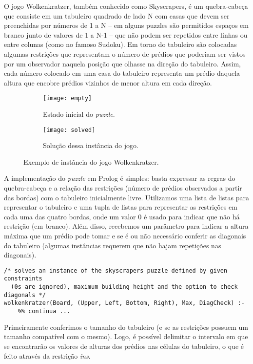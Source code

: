 O jogo Wolkenkratzer, também conhecido como Skyscrapers, é um quebra-cabeça que consiste em um tabuleiro quadrado de lado N com casas que devem ser preenchidas por números de 1 a N -- em alguns puzzles são permitidos espaços em branco junto de valores de 1 a N-1 -- que não podem ser repetidos entre linhas ou entre colunas (como no famoso Sudoku).
Em torno do tabuleiro são colocadas algumas restrições que representam o número de prédios que poderiam ser vistos por um observador naquela posição que olhasse na direção do tabuleiro.
Assim, cada número colocado em uma casa do tabuleiro representa um prédio daquela altura que encobre prédios vizinhos de menor altura em cada direção.

\begin{figure}[!htbp]
  \centering
  \begin{subfigure}[t]{0.45\textwidth}
    \centering
    \texttt{[image: empty]}
    \caption{Estado inicial do \textit{puzzle}.}
  \end{subfigure}
  \begin{subfigure}[t]{0.45\textwidth}
    \centering
    \texttt{[image: solved]}
    \caption{Solução dessa instância do jogo.}
  \end{subfigure}
  \caption{Exemplo de instância do jogo Wolkenkratzer.}
  \label{fig:example}
\end{figure}

A implementação do \textit{puzzle} em Prolog é simples: basta expressar as regras do quebra-cabeça e a relação das restrições (número de prédios observados a partir das bordas) com o tabuleiro inicialmente livre.
Utilizamos uma lista de listas para representar o tabuleiro e uma tupla de listas para representar as restrições em cada uma das quatro bordas, onde um valor $0$ é usado para indicar que não há restrição (em branco).
Além disso, recebemos um parâmetro para indicar a altura máxima que um prédio pode tomar e se é ou não necessário conferir as diagonais do tabuleiro (algumas instâncias requerem que não hajam repetições nas diagonais).

\begin{verbatim}
/* solves an instance of the skyscrapers puzzle defined by given constraints
  (0s are ignored), maximum building height and the option to check diagonals */
wolkenkratzer(Board, (Upper, Left, Bottom, Right), Max, DiagCheck) :-
    %% continua ...
\end{verbatim}

Primeiramente conferimos o tamanho do tabuleiro (e se as restrições possuem um tamanho compatível com o mesmo).
Logo, é possível delimitar o intervalo em que se encontrarão os valores de alturas dos prédios nas células do tabuleiro, o que é feito através da restrição \textit{ins}.

